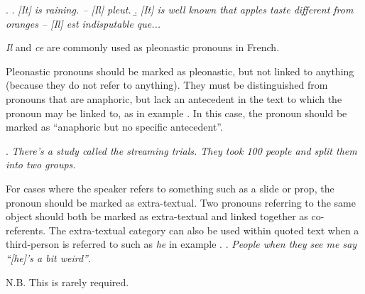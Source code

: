 \documentclass[a4paper]{article}
\begin{document}
{{\ex.
\a. {\sl [It] is raining. -- [Il] pleut.}
\b. {\sl [It] is well known that apples taste different from oranges --  [Il]
est indisputable que...}

\textsl{Il} and \textsl{ce} are commonly used as pleonastic pronouns in French.



Pleonastic pronouns should be marked as pleonastic, but not linked to anything
(because they do not refer to anything). They must be distinguished from
pronouns that are anaphoric, but lack an antecedent in the text to which the
pronoun may be linked to, as in example \Next. In this case, the pronoun should
be marked as ``anaphoric but no specific antecedent''.

\ex. {\sl There's a study called the streaming trials. {\sl They} took 100 people and split them into two groups.}

For cases where the speaker refers to something such as a slide or prop, the pronoun should be marked as extra-textual. Two pronouns referring to the same object should both be marked as extra-textual and linked together as co-referents.
The extra-textual category can also be used within quoted text when a third-person is referred to such as {\sl he} in example \Next.
\ex.
{\sl People when they see me say ``[he]'s a bit weird''}.

N.B. This is rarely required.


% 
% 

}}
\end{document}
